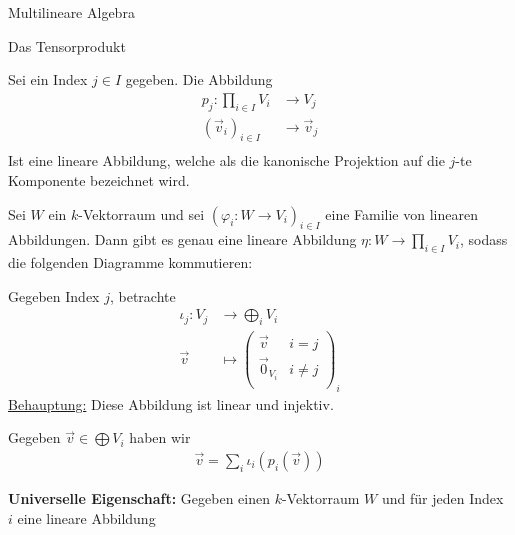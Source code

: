 \documentclass{report}
\newcommand{\ul}[1]{\underline{#1}}
\newcommand{\vv}{\vec{v}}
\newcommand{\vz}{\vec{0}}
\begin{document}
\begin{chapter}{Multilineare Algebra}
\begin{section}{Das Tensorprodukt}
   \begin{definition}
    Sei ein Index $j \in I$ gegeben. Die Abbildung 
    \begin{align*}
            p_j : \prod_{i \in I} V_i &\to V_j\\
            (\vv_i)_{i \in I} &\to \vv_j\\
    \end{align*}
    Ist eine lineare Abbildung, welche als die kanonische Projektion auf die $j$-te Komponente bezeichnet wird.
   \end{definition}
   \begin{theorem}
    Sei $W$ ein $k$-Vektorraum und sei $(\varphi_i : W \to V_i)_{i \in I}$ eine Familie von linearen Abbildungen. Dann gibt es genau eine lineare Abbildung $\eta : W \to \prod_{i \in I} V_i$, sodass die folgenden Diagramme kommutieren:
    \begin{figure}[h!]
        \centering
    \end{figure}
   \end{theorem}
	\begin{definition}
		Gegeben Index $j$, betrachte
		\begin{align*}
			\iota_j : V_j &\to \bigoplus_i V_i\\
				  \vv &\mapsto 
				  \begin{pmatrix}
				  	\vv & i = j\\
				  	\vz_{V_i} & i \neq j\\
				  \end{pmatrix}_i
		\end{align*}
		\ul{Behauptung:} Diese Abbildung ist linear und injektiv.
	\end{definition}
	\begin{proposition}
	Gegeben $\vv \in \bigoplus V_i$ haben wir
	\begin{align*}
		\vv = \sum_i \iota_i(p_i(\vv))
	\end{align*}
	\end{proposition}
	\begin{theorem}
		\textbf{Universelle Eigenschaft:} Gegeben einen $k$-Vektorraum $W$ und für jeden Index $i$ eine lineare Abbildung

\end{theorem}
\end{section}
\end{chapter}
\end{document}
